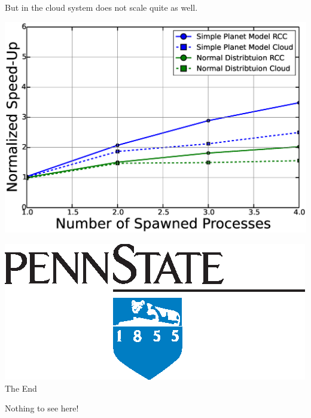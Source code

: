 \documentclass{beamer}
\begin{document}
\begin{frame}{But in the cloud system does not scale quite as well.}
\begin{center}
\includegraphics[scale=.3]{speedup-vs.eps}
\end{center}
\end{frame}


\begin{frame}[plain]
\begin{center}
\includegraphics{mark2tonesolid.eps}
\Huge
The End
\end{center}
\end{frame}

\begin{frame}[plain]
\begin{center}
\Huge
Nothing to see here!
\end{center}
\end{frame}


\appendix
\end{document}
